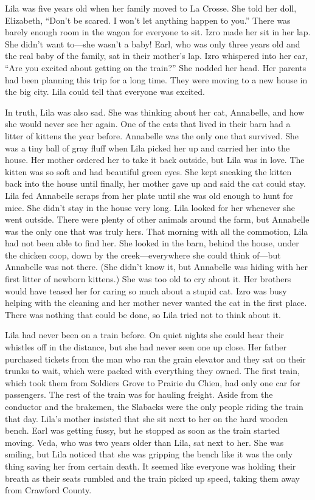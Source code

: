 \documentclass[
  american,
  letterpaper,
]{book}
\begin{document}
Lila was five years old when her family moved to La Crosse. She told her
doll, Elizabeth, ``Don't be scared. I won't let anything happen to
you.'' There was barely enough room in the wagon for everyone to sit.
Izro made her sit in her lap. She didn't want to---she wasn't a baby!
Earl, who was only three years old and the real baby of the family, sat
in their mother's lap. Izro whispered into her ear, ``Are you excited
about getting on the train?'' She nodded her head. Her parents had been
planning this trip for a long time. They were moving to a new house in
the big city. Lila could tell that everyone was excited.

In truth, Lila was also sad. She was thinking about her cat, Annabelle,
and how she would never see her again. One of the cats that lived in
their barn had a litter of kittens the year before. Annabelle was the
only one that survived. She was a tiny ball of gray fluff when Lila
picked her up and carried her into the house. Her mother ordered her to
take it back outside, but Lila was in love. The kitten was so soft and
had beautiful green eyes. She kept sneaking the kitten back into the
house until finally, her mother gave up and said the cat could stay.
Lila fed Annabelle scraps from her plate until she was old enough to
hunt for mice. She didn't stay in the house very long. Lila looked for
her whenever she went outside. There were plenty of other animals around
the farm, but Annabelle was the only one that was truly hers. That
morning with all the commotion, Lila had not been able to find her. She
looked in the barn, behind the house, under the chicken coop, down by
the creek---everywhere she could think of---but Annabelle was not there.
(She didn't know it, but Annabelle was hiding with her first litter of
newborn kittens.) She was too old to cry about it. Her brothers would
have teased her for caring so much about a stupid cat. Izro was busy
helping with the cleaning and her mother never wanted the cat in the
first place. There was nothing that could be done, so Lila tried not to
think about it.

Lila had never been on a train before. On quiet nights she could hear
their whistles off in the distance, but she had never seen one up close.
Her father purchased tickets from the man who ran the grain elevator and
they sat on their trunks to wait, which were packed with everything they
owned. The first train, which took them from Soldiers Grove to Prairie
du Chien, had only one car for passengers. The rest of the train was for
hauling freight. Aside from the conductor and the brakemen, the Slabacks
were the only people riding the train that day. Lila's mother insisted
that she sit next to her on the hard wooden bench. Earl was getting
fussy, but he stopped as soon as the train started moving. Veda, who was
two years older than Lila, sat next to her. She was smiling, but Lila
noticed that she was gripping the bench like it was the only thing
saving her from certain death. It seemed like everyone was holding their
breath as their seats rumbled and the train picked up speed, taking them
away from Crawford County.
\end{document}
